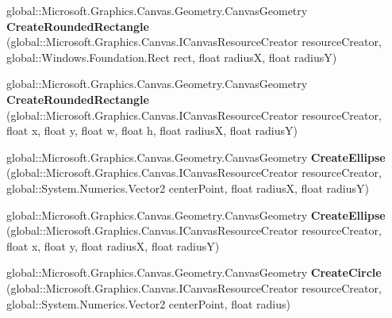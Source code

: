 \begin{DoxyCompactItemize}
global\+::\+Microsoft.\+Graphics.\+Canvas.\+Geometry.\+Canvas\+Geometry {\bfseries Create\+Rounded\+Rectangle} (global\+::\+Microsoft.\+Graphics.\+Canvas.\+I\+Canvas\+Resource\+Creator resource\+Creator, global\+::\+Windows.\+Foundation.\+Rect rect, float radiusX, float radiusY)
\item 
\mbox{\label{interface_microsoft_1_1_graphics_1_1_canvas_1_1_geometry_1_1_i_canvas_geometry_statics_af546671007c12a6d9127c6fca9180c5b}} 
global\+::\+Microsoft.\+Graphics.\+Canvas.\+Geometry.\+Canvas\+Geometry {\bfseries Create\+Rounded\+Rectangle} (global\+::\+Microsoft.\+Graphics.\+Canvas.\+I\+Canvas\+Resource\+Creator resource\+Creator, float x, float y, float w, float h, float radiusX, float radiusY)
\item 
\mbox{\label{interface_microsoft_1_1_graphics_1_1_canvas_1_1_geometry_1_1_i_canvas_geometry_statics_ab568c0cde767f2a6103d7a1052f40358}} 
global\+::\+Microsoft.\+Graphics.\+Canvas.\+Geometry.\+Canvas\+Geometry {\bfseries Create\+Ellipse} (global\+::\+Microsoft.\+Graphics.\+Canvas.\+I\+Canvas\+Resource\+Creator resource\+Creator, global\+::\+System.\+Numerics.\+Vector2 center\+Point, float radiusX, float radiusY)
\item 
\mbox{\label{interface_microsoft_1_1_graphics_1_1_canvas_1_1_geometry_1_1_i_canvas_geometry_statics_addd384355b7e85eba839be661ab3dff0}} 
global\+::\+Microsoft.\+Graphics.\+Canvas.\+Geometry.\+Canvas\+Geometry {\bfseries Create\+Ellipse} (global\+::\+Microsoft.\+Graphics.\+Canvas.\+I\+Canvas\+Resource\+Creator resource\+Creator, float x, float y, float radiusX, float radiusY)
\item 
\mbox{\label{interface_microsoft_1_1_graphics_1_1_canvas_1_1_geometry_1_1_i_canvas_geometry_statics_ad8d580654397bcf2af6830928e681dc2}} 
global\+::\+Microsoft.\+Graphics.\+Canvas.\+Geometry.\+Canvas\+Geometry {\bfseries Create\+Circle} (global\+::\+Microsoft.\+Graphics.\+Canvas.\+I\+Canvas\+Resource\+Creator resource\+Creator, global\+::\+System.\+Numerics.\+Vector2 center\+Point, float radius)

\end{DoxyCompactItemize}
